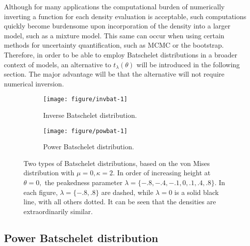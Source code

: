 Although for many applications the computational burden of numerically inverting a function for each density evaluation is acceptable, such computations quickly become burdensome upon incorporation of the density into a larger model, such as a mixture model. This same can occur when using certain methods for uncertainty quantification, such as MCMC or the bootstrap. Therefore, in order to be able to employ Batschelet distributions in a broader context of models, an alternative to  \(t_\lambda(\theta)\) will be introduced in the following section. The major advantage will be that the alternative will not require numerical inversion.

\begin{figure}
\begin{center}
  \begin{subfigure}[t]{0.5\linewidth}
\begin{knitrout}
\color{fgcolor}
\texttt{[image: figure/invbat-1]} 

\end{knitrout}
    \caption{Inverse Batschelet distribution.}
    \label{fig:pdf_compare:invbat}
  \end{subfigure}%
  \begin{subfigure}[t]{0.5\linewidth}
\begin{knitrout}
\color{fgcolor}
\texttt{[image: figure/powbat-1]} 

\end{knitrout}
    \caption{Power Batschelet distribution.}
    \label{fig:pdf_compare:powbat}
  \end{subfigure}%
\end{center}
\caption{Two types of Batschelet distributions, based on the von Mises distribution with \(\mu = 0, \kappa = 2\). In order of increasing height at \(\theta = 0,\) the peakedness parameter \(\lambda = \{-.8, -.4, -.1, 0, .1, .4, .8\}\). In each figure, \(\lambda = \{-.8, .8\}\) are dashed, while \(\lambda = 0\) is a solid black line, with all others dotted. It can be seen that the densities are extraordinarily similar.}
\label{fig:pdf_compare}
\end{figure}

\subsection{Power Batschelet distribution}


